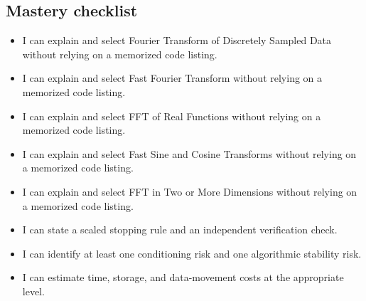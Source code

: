 \documentclass[10pt,letterpaper]{article}
\begin{document}
\subsection*{Mastery checklist}
\begin{itemize}
\item[$\square$] I can explain and select Fourier Transform of Discretely Sampled Data without relying on a memorized code listing.
\item[$\square$] I can explain and select Fast Fourier Transform without relying on a memorized code listing.
\item[$\square$] I can explain and select FFT of Real Functions without relying on a memorized code listing.
\item[$\square$] I can explain and select Fast Sine and Cosine Transforms without relying on a memorized code listing.
\item[$\square$] I can explain and select FFT in Two or More Dimensions without relying on a memorized code listing.
\item[$\square$] I can state a scaled stopping rule and an independent verification check.
\item[$\square$] I can identify at least one conditioning risk and one algorithmic stability risk.
\item[$\square$] I can estimate time, storage, and data-movement costs at the appropriate level.
\end{itemize}
\end{document}

